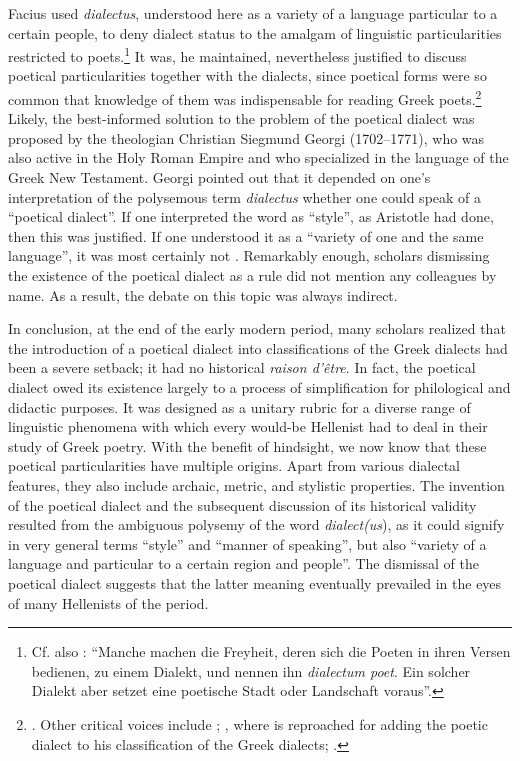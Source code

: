 Facius used \textit{dialectus}, understood here as a variety of a language particular to a certain people, to deny dialect status to the amalgam of linguistic particularities restricted to poets.\footnote{Cf. also \citet[67]{Haas1780}: “Manche machen die Freyheit, deren sich die Poeten in ihren Versen bedienen, zu einem Dialekt, und nennen ihn \textit{dialectum poet}. Ein solcher Dialekt aber setzet eine poetische Stadt oder Landschaft voraus”.} It was, he maintained, nevertheless justified to discuss poetical particularities together with the dialects, since poetical forms were so common that knowledge of them was indispensable for reading Greek poets.\footnote{\citet[98]{Facius1782}. Other critical voices include \citet[\textsc{a.3}\textsc{\textsuperscript{v}}]{Bolius1689}; \citet[\textsc{d.2}\textsc{\textsuperscript{v}}]{Thryllitsch1709}, where \citet[147]{Reyher1634} is reproached for adding the poetic dialect to his classification of the Greek dialects; \citet[136--167]{Walch1772}.} Likely, the best-informed solution to the problem of the poetical dialect was proposed by the theologian Christian Siegmund Georgi (1702–1771), who was also active in the Holy Roman Empire and who specialized in the language of the Greek New Testament. Georgi pointed out that it depended on one’s interpretation of the polysemous term \textit{dialectus} whether one could speak of a “poetical dialect”. If one interpreted the word as “style”, as Aristotle had done, then this was justified. If one understood it as a “variety of one and the same language”, it was most certainly not \citep[169]{Georgi1733}. Remarkably enough, scholars dismissing the existence of the poetical dialect as a rule did not mention any colleagues by name. As a result, the debate on this topic was always indirect.

In conclusion, at the end of the early modern period, many scholars realized that the introduction of a poetical dialect into classifications of the Greek dialects had been a severe setback; it had no historical \textit{raison d’être}. In fact, the poetical dialect owed its existence largely to a process of simplification for philological and didactic purposes. It was designed as a unitary rubric for a diverse range of linguistic phenomena with which every would-be Hellenist had to deal in their study of Greek poetry. With the benefit of hindsight, we now know that these poetical particularities have multiple origins. Apart from various dialectal features, they also include archaic, metric, and stylistic properties. The invention of the poetical dialect and the subsequent discussion of its historical validity resulted from the ambiguous polysemy of the word \textit{dialect(us}), as it could signify in very general terms “style” and “manner of speaking”, but also “variety of a language and particular to a certain region and people”. The dismissal of the poetical dialect suggests that the latter meaning eventually prevailed in the eyes of many Hellenists of the period.

